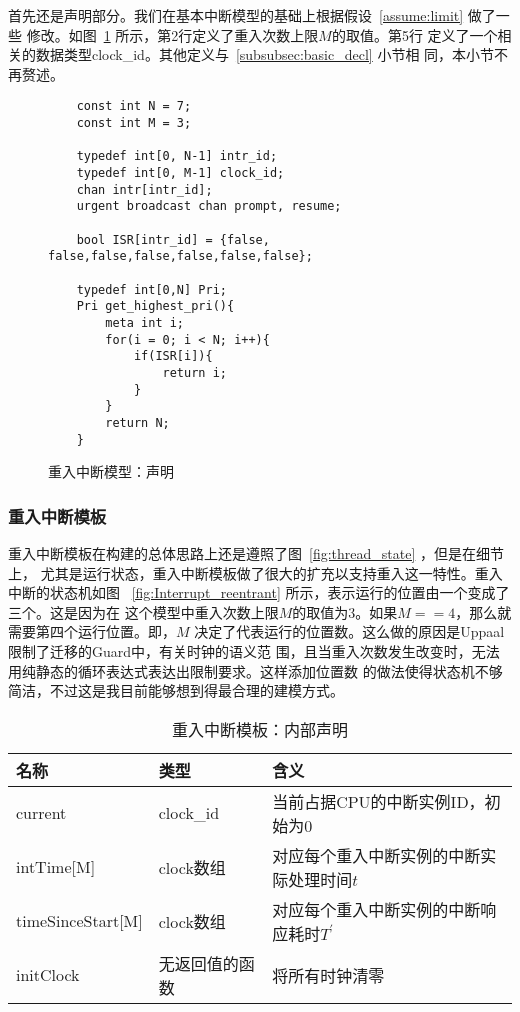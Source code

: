 首先还是声明部分。我们在基本中断模型的基础上根据假设~\ref{assume:limit} 做了一些
修改。如图~\ref{fig:reentrant_decl} 所示，第2行定义了重入次数上限$M$的取值。第5行
定义了一个相关的数据类型clock\_id。其他定义与~\ref{subsubsec:basic_decl} 小节相
同，本小节不再赘述。

\begin{figure}[H]
	\centering
	\begin{lstlisting}
	const int N = 7;
	const int M = 3;
	
	typedef int[0, N-1] intr_id; 
	typedef int[0, M-1] clock_id;
	chan intr[intr_id];
	urgent broadcast chan prompt, resume;
	
	bool ISR[intr_id] = {false, false,false,false,false,false,false};
	
	typedef int[0,N] Pri;
	Pri get_highest_pri(){
		meta int i;
		for(i = 0; i < N; i++){
			if(ISR[i]){
				return i;
			} 
		}
		return N;
	}
	\end{lstlisting}
	\caption{重入中断模型：声明}
	\label{fig:reentrant_decl}
\end{figure}

\subsubsection{重入中断模板}
\label{subsubsec:reentrant_intr}
重入中断模板在构建的总体思路上还是遵照了图~\ref{fig:thread_state} ，但是在细节上，
尤其是运行状态，重入中断模板做了很大的扩充以支持重入这一特性。重入中断的状态机如图
~\ref{fig:Interrupt_reentrant} 所示，表示运行的位置由一个变成了三个。这是因为在
这个模型中重入次数上限$M$的取值为3。如果$M==4$，那么就需要第四个运行位置。即，$M$
决定了代表运行的位置数。这么做的原因是Uppaal限制了迁移的Guard中，有关时钟的语义范
围，且当重入次数发生改变时，无法用纯静态的循环表达式表达出限制要求。这样添加位置数
的做法使得状态机不够简洁，不过这是我目前能够想到得最合理的建模方式。

\begin{table}[htb]
	\centering
	\caption{重入中断模板：内部声明}
	\label{tab:reentrant_intr_decl}
	\begin{tabularx}{\linewidth}{p{7em}p{5em}X}
		\toprule[1.5pt]
		{\heiti 名称} & {\heiti 类型} & {\heiti 含义}\\
		\midrule[1pt]
		current & clock\_id & 当前占据CPU的中断实例ID，初始为0 \\
		\midrule[0.5pt]
		intTime[M] & clock数组 & 对应每个重入中断实例的中断实际处理时间$t$ \\
		\midrule[0.5pt]
		timeSinceStart[M] & clock数组 & 对应每个重入中断实例的中断响应耗时$T^\prime$ \\
		\midrule[0.5pt]
		initClock & 无返回值的函数 & 将所有时钟清零 \\
		\bottomrule[1.5pt]
	\end{tabularx}
\end{table}


